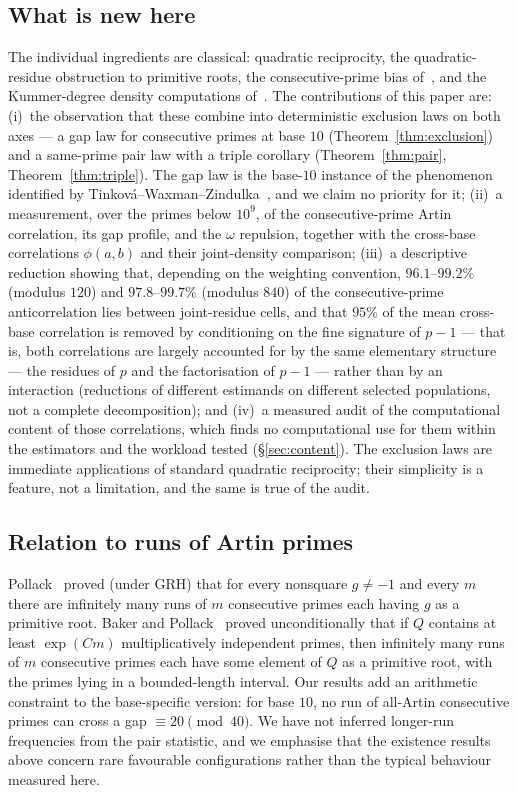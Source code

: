 \documentclass[11pt,reqno]{amsart}
\theoremstyle{plain}
\theoremstyle{definition}
\begin{document}
\subsection*{What is new here}
The individual ingredients are classical: quadratic reciprocity, the quadratic-residue
obstruction to primitive roots, the consecutive-prime bias of~\cite{LOS2016}, and the
Kummer-degree density computations of~\cite{Matthews1976,MoreeStevenhagen2014}. The
contributions of this paper are: (i)~the observation that these combine into deterministic
exclusion laws on both axes --- a gap law for consecutive primes at base $10$
(Theorem~\ref{thm:exclusion}) and a same-prime pair law with a triple corollary
(Theorem~\ref{thm:pair}, Theorem~\ref{thm:triple}). The gap law is the base-$10$ instance of
the phenomenon identified by Tinkov\'a--Waxman--Zindulka~\cite{TinkovaWaxmanZindulka2023},
and we claim no priority for it; (ii)~a measurement, over the primes below $10^9$, of the
consecutive-prime Artin correlation, its gap profile, and the $\omega$ repulsion, together
with the cross-base correlations $\phi(a,b)$ and their joint-density comparison; (iii)~a
descriptive reduction showing that, depending on the weighting convention, $96.1$--$99.2\%$
(modulus $120$) and $97.8$--$99.7\%$ (modulus $840$) of the consecutive-prime anticorrelation
lies between joint-residue cells, and that $95\%$ of the mean
cross-base correlation is removed by conditioning on the fine signature of $p-1$ --- that is,
both correlations are largely accounted for by the same elementary structure
--- the residues of $p$ and the factorisation of $p-1$ --- rather than by an interaction
(reductions of different estimands on different selected populations, not a complete
decomposition); and (iv)~a measured audit of the computational content
of those correlations, which finds no computational use for them within the estimators and the
workload tested (\S\ref{sec:content}). The exclusion laws are immediate
applications of standard quadratic reciprocity; their simplicity is a feature, not a
limitation, and the same is true of the audit.

\subsection*{Relation to runs of Artin primes}
Pollack~\cite{Pollack2014} proved (under GRH) that for every nonsquare $g\neq-1$ and every
$m$ there are infinitely many runs of $m$ consecutive primes each having $g$ as a primitive
root. Baker and Pollack~\cite{BakerPollack2016} proved unconditionally that if $Q$ contains
at least $\exp(Cm)$ multiplicatively independent primes, then infinitely many runs of $m$
consecutive primes each have some element of $Q$ as a primitive root, with the primes lying
in a bounded-length interval. Our results add an arithmetic constraint to the base-specific
version: for base $10$, no run of all-Artin consecutive primes can cross a gap
$\equiv 20 \pmod{40}$. We have not inferred longer-run frequencies from the pair statistic,
and we emphasise that the existence results above concern rare favourable configurations
rather than the typical behaviour measured here.
\end{document}

